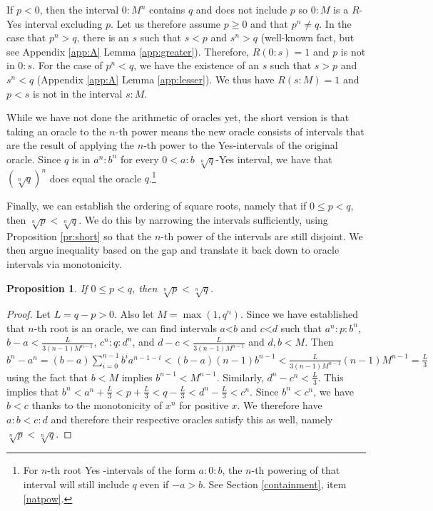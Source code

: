 \documentclass[12pt]{article}
\newtheorem{proposition}{Proposition}[subsection]
\theoremstyle{remark}
\newcommand{\lt}{\mathord{<}}
\begin{document}
\begin{enumerate}
    If $p < 0$, then the interval $0:M^n$ contains $q$ and does not include $p$ so $0:M$ is a $R$-Yes interval excluding $p$. Let us therefore assume $p \geq 0$ and that $p^n \neq q$. In the case that $p^n > q$, there is an $s$ such that $s<p$ and $s^n > q$ (well-known fact, but see Appendix \ref{app:A} Lemma \ref{app:greater}). Therefore, $R(0:s) = 1$ and $p$ is not in $0:s$. For the case of $p^n < q$, we have the existence of an $s$ such that $s > p$ and $s^n < q$ (Appendix \ref{app:A} Lemma \ref{app:lesser}). We thus have $R(s:M)=1$ and $p < s$ is not in the interval $s:M$.
    
\end{enumerate}

While we have not done the arithmetic of oracles yet, the short version is that taking an oracle to the $n$-th power means the new oracle consists of intervals that are the result of applying the $n$-th power to the Yes-intervals of the original oracle. Since $q$ is in $a^n:b^n$ for every $0<a:b$ $\sqrt[n]{q}$-Yes interval, we have that $(\sqrt[n]{q})^n$ does equal the oracle $q$.\footnote{For $n$-th root Yes -intervals of the form $a:0:b$, the $n$-th powering of that interval will still include $q$ even if $-a>b$. See Section \ref{containment}, item \ref{natpow}.} 

Finally, we can establish the ordering of square roots, namely that if $0 \leq p<q$, then $\sqrt[n]{p} < \sqrt[n]{q}$. We do this by narrowing the intervals sufficiently, using Proposition \ref{pr:short} so that the $n$-th power of the intervals are still disjoint. We then argue inequality based on the gap and translate it back down to oracle intervals via monotonicity. 

\begin{proposition}
    If $0 \leq p <q$, then $\sqrt[n]{p} < \sqrt[n]{q}$.
\end{proposition}

\begin{proof}
    Let $L = q-p > 0$. Also let $M = \max(1, q^n)$.  Since we have established that $n$-th root is an oracle, we can find intervals $a\lt b$ and $c \lt d$ such that $a^n:p:b^n$, $b-a < \frac{L}{3(n-1)M^{n-1}}$, $c^n:q:d^n$, and $d-c < \frac{L}{3(n-1)M^{n-1}}$ and $d, b < M$.  Then $b^n-a^n = (b-a) \sum_{i=0}^{n-1} b^i a^{n-1-i} < (b-a)(n-1) b^{n-1} < \frac{L}{3(n-1)M^{n-1}} (n-1) M^{n-1} = \frac{L}{3}$ using the fact that $b<M$ implies $b^{n-1} < M^{n-1}$. Similarly, $d^n-c^n < \frac{L}{3}$. This implies that $b^n < a^n + \frac{L}{3} < p + \frac{L}{3} < q -  \frac{L}{3} < d^n - \frac{L}{3} < c^n$. Since $b^n < c^n$, we have $b < c$ thanks to the monotonicity of $x^n$ for positive $x$. We therefore have $a:b < c:d$ and therefore their respective oracles satisfy this as well, namely $\sqrt[n]{p} < \sqrt[n]{q}$.
\end{proof}
\end{document}
